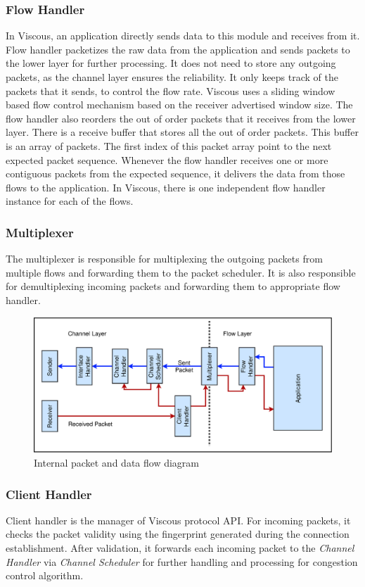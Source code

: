 \subsubsection{Flow Handler}
In Viscous, an application directly sends data to this module and receives from it. Flow handler packetizes the raw data from the application and sends packets to the lower layer for further processing. It does not need to store any outgoing packets, as the channel layer ensures the reliability. It only keeps track of the packets that it sends, to control the flow rate. Viscous uses a sliding window based flow control mechanism based on the receiver advertised window size.
The flow handler also reorders the out of order packets that it receives from the lower layer. There is a receive buffer that stores all the out of order packets. This buffer is an array of packets. The first index of this packet array point to the next expected packet sequence. Whenever the flow handler receives one or more contiguous packets from the expected sequence, it delivers the data from those flows to the application. In Viscous, there is one independent flow handler instance for each of the flows.

\subsubsection{Multiplexer}
The multiplexer is responsible for multiplexing the outgoing packets from multiple flows and forwarding them to the packet scheduler. It is also responsible for demultiplexing incoming packets and forwarding them to appropriate flow handler. 

\begin{figure}[!t]
	\centering
	\includegraphics[width=.9\linewidth]{img/ModularDiagram}
	\caption{Internal packet and data flow diagram}
	\label{fig:ModularDiagram}
\end{figure}


\subsubsection{Client Handler}
Client handler is the manager of Viscous protocol API. 
For incoming packets, it checks the packet validity using the fingerprint generated during the connection establishment. 
After validation, it forwards each incoming packet to the {\em Channel Handler} via {\em Channel Scheduler} for further handling and processing for congestion control algorithm. 

